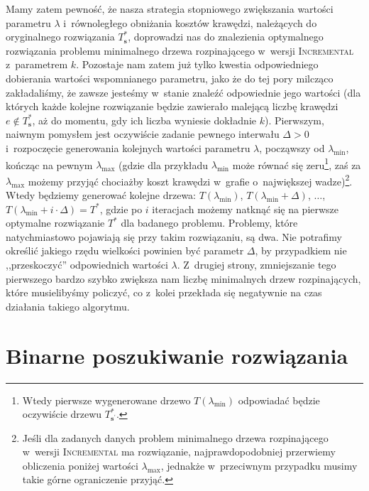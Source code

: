 Mamy zatem pewność, że nasza strategia stopniowego zwiększania wartości parametru $\lambda$ i~równoległego obniżania kosztów krawędzi, należących do oryginalnego rozwiązania $T^{\ast}_{\textbf{s}}$, doprowadzi nas do znalezienia optymalnego rozwiązania problemu minimalnego drzewa rozpinającego w~wersji \textsc{Incremental} z~parametrem $k$.
Pozostaje nam zatem już tylko kwestia odpowiedniego dobierania wartości wspomnianego parametru, jako że do tej pory milcząco zakładaliśmy, że zawsze jesteśmy w~stanie znaleźć odpowiednie jego wartości (dla których każde kolejne rozwiązanie będzie zawierało malejącą liczbę krawędzi $e \notin T^{\ast}_{\textbf{s}}$, aż do momentu, gdy ich liczba wyniesie dokładnie $k$).
Pierwszym, naiwnym pomysłem jest oczywiście zadanie pewnego interwału $\Delta > 0$ i~rozpoczęcie generowania kolejnych wartości parametru $\lambda$, począwszy od $\lambda_{\text{min}}$, kończąc na pewnym $\lambda_{\text{max}}$ (gdzie dla przykładu $\lambda_{\text{min}}$ może równać się zeru\footnote{
	Wtedy pierwsze wygenerowane drzewo $T \left( \lambda_{\text{min}} \right)$ odpowiadać będzie oczywiście drzewu $T^{\ast}_{\textbf{s}^{\prime}}$.
}, zaś za $\lambda_{\text{max}}$ możemy przyjąć chociażby koszt krawędzi w~grafie o~największej wadze)\footnote{
	Jeśli dla zadanych danych problem minimalnego drzewa rozpinającego w~wersji \textsc{Incremental} ma rozwiązanie, najprawdopodobniej przerwiemy obliczenia poniżej wartości $\lambda_{\text{max}}$, jednakże w~przeciwnym przypadku musimy takie górne ograniczenie przyjąć.
}.
Wtedy będziemy generować kolejne drzewa: $T \left( \lambda_{\text{min}} \right)$, $T \left( \lambda_{\text{min}} + \Delta \right)$, $\dots$, $T \left( \lambda_{\text{min}} + i \cdot \Delta \right) = T^{\ast}$, gdzie po $i$ iteracjach możemy natknąć się na pierwsze optymalne rozwiązanie $T^{\ast}$ dla badanego problemu.
Problemy, które natychmiastowo pojawiają się przy takim rozwiązaniu, są dwa.
Nie potrafimy określić jakiego rzędu wielkości powinien być parametr $\Delta$, by przypadkiem nie ,,przeskoczyć'' odpowiednich wartości $\lambda$.
Z~drugiej strony, zmniejszanie tego pierwszego bardzo szybko zwiększa nam liczbę minimalnych drzew rozpinających, które musielibyśmy policzyć, co z~kolei przekłada się negatywnie na czas działania takiego algorytmu.




\section{Binarne poszukiwanie rozwiązania}




